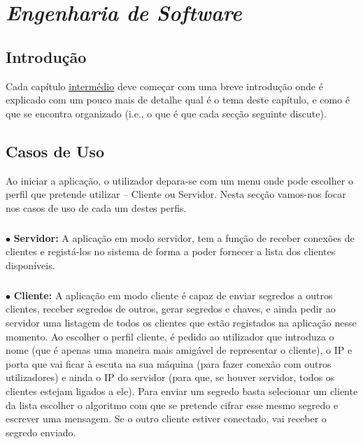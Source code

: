 \chapter{\textit{Engenharia de Software}}
\label{chap:tecno-ferra}

\section{Introdução}
\label{chap3:sec:intro}
Cada capítulo \underline{intermédio} deve começar com uma breve introdução onde é explicado com um pouco mais de detalhe qual é o tema deste capítulo, e como é que se encontra organizado (i.e., o que é que cada secção seguinte discute).

\section{Casos de Uso}
\label{chap3:sec:casos}

Ao iniciar a aplicação, o utilizador depara-se com um menu onde pode escolher o perfil que pretende utilizar -- Cliente ou Servidor. Nesta secção vamos-nos focar nos casos de uso de cada um destes perfis.
\paragraph{}
$\bullet$ \textbf{ Servidor:} A aplicação em modo servidor, tem a função de receber conexões de clientes e registá-los no sistema de forma a poder fornecer a lista dos clientes disponíveis.
\paragraph{}
$\bullet$ \textbf{ Cliente:} A aplicação em modo cliente é capaz de enviar segredos a outros clientes, receber segredos de outros, gerar segredos e chaves, e ainda pedir ao servidor uma listagem de todos os clientes que estão registados na aplicação nesse momento. Ao escolher o perfil cliente, é pedido ao utilizador que introduza o nome (que é apenas uma maneira mais amigável de representar o cliente), o IP e porta que vai ficar à escuta na sua máquina (para fazer conexão com outros utilizadores) e ainda o IP do servidor (para que, se houver servidor, todos os clientes estejam ligados a ele). Para enviar um segredo basta selecionar um cliente da lista escolher o algoritmo com que se pretende cifrar esse mesmo segredo e escrever uma mensagem. Se o outro cliente estiver conectado, vai receber o segredo enviado.


